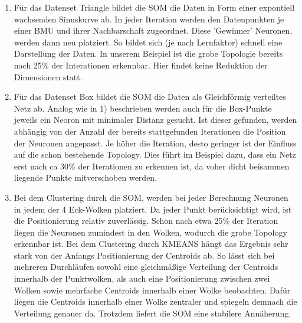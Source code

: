 \begin{enumerate}
	\item Für das Datenset Triangle bildet die SOM die Daten in Form einer expontiell wachsenden Sinuskurve ab. In jeder Iteration werden den Datenpunkten je einer BMU und ihrer Nachbarschaft zugeordnet. Diese 'Gewinner' Neuronen, werden dann neu platziert. So bildet sich (je nach Lernfaktor) schnell eine Darstellung der Daten. In  unserem Beispiel ist die grobe Topologie bereits nach 25\% der Interationen erkennbar. Hier findet keine Reduktion der Dimensionen statt.

	\item Für das Datenset Box bildet die SOM die Daten als Gleichförmig verteiltes Netz ab. Analog wie in 1) beschrieben werden auch für die Box-Punkte jeweils ein Neoron mit minimaler Distanz gesucht. Ist dieser gefunden, werden abhängig von der Anzahl der bereits stattgefunden Iterationen die Position der Neuronen angepasst. Je höher die Iteration, desto geringer ist der Einfluss auf die schon bestehende Topology. Dies führt im Beispiel dazu, dass ein Netz erst nach ca 30\% der Iterationen zu erkennen ist, da voher dicht beisammen liegende Punkte mitverschoben werden.
	
	\item Bei dem Clustering durch die SOM, werden bei jeder Berechnung Neuronen in jedem der 4 Eck-Wolken platziert. Da jeder Punkt berücksichtigt wird, ist die Positionierung relativ zuverlässig. Schon nach etwa 25\% der Iteration liegen die Neuronen  zumindest in den Wolken, wodurch die grobe Topology erkennbar ist. Bei dem Clustering durch KMEANS hängt das Ergebnis sehr stark von der Anfangs Positionierung der Centroids ab. So lässt sich bei mehreren Durchläufen sowohl eine gleichmäßige Verteilung der Centroids innerhalb der Punktwolken, als auch eine Positionierung zwischen zwei Wolken sowie mehrfache Centroids innerhalb einer Wolke beobachten. Dafür liegen die Centroids innerhalb einer Wolke zentraler und spiegeln demnach die Verteilung genauer da. Trotzdem liefert die SOM eine stabilere Annäherung.
\end{enumerate}
